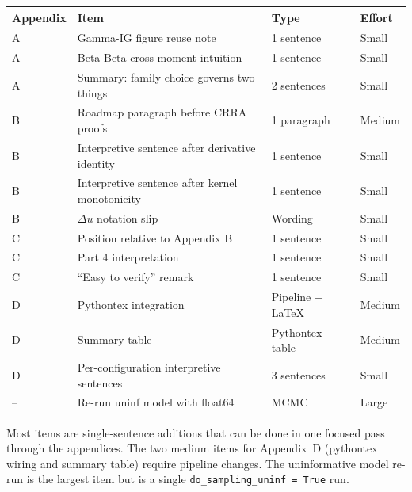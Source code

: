 \documentclass[11pt,a4paper]{article}
\begin{document}
\begin{center}
\begin{tabular}{llll}
  \toprule
  Appendix & Item & Type & Effort \\
  \midrule
  A & Gamma-IG figure reuse note & 1 sentence & Small \\
  A & Beta-Beta cross-moment intuition & 1 sentence & Small \\
  A & Summary: family choice governs two things & 2 sentences & Small \\
  B & Roadmap paragraph before CRRA proofs & 1 paragraph & Medium \\
  B & Interpretive sentence after derivative identity & 1 sentence & Small \\
  B & Interpretive sentence after kernel monotonicity & 1 sentence & Small \\
  B & $\Delta u$ notation slip & Wording & Small \\
  C & Position relative to Appendix B & 1 sentence & Small \\
  C & Part 4 interpretation & 1 sentence & Small \\
  C & ``Easy to verify'' remark & 1 sentence & Small \\
  D & Pythontex integration & Pipeline + \LaTeX & Medium \\
  D & Summary table & Pythontex table & Medium \\
  D & Per-configuration interpretive sentences & 3 sentences & Small \\
  -- & Re-run uninf model with float64 & MCMC & Large \\
  \bottomrule
\end{tabular}
\end{center}

Most items are single-sentence additions that can be done in one focused
pass through the appendices. The two medium items for Appendix~D
(pythontex wiring and summary table) require pipeline changes. The
uninformative model re-run is the largest item but is a single
\texttt{do\_sampling\_uninf = True} run.
\end{document}
